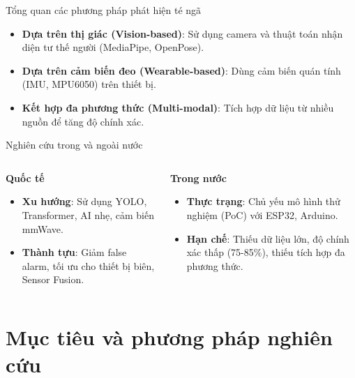 \begin{frame}{Tổng quan các phương pháp phát hiện té ngã}
    \begin{itemize}
        \item \textbf{Dựa trên thị giác (Vision-based)}: Sử dụng camera và thuật toán nhận diện tư thế người (MediaPipe, OpenPose).
        \item \textbf{Dựa trên cảm biến đeo (Wearable-based)}: Dùng cảm biến quán tính (IMU, MPU6050) trên thiết bị.
        \item \textbf{Kết hợp đa phương thức (Multi-modal)}: Tích hợp dữ liệu từ nhiều nguồn để tăng độ chính xác.
    \end{itemize}
\end{frame}

\begin{frame}{Nghiên cứu trong và ngoài nước}
    \begin{columns}[T]
        \begin{column}{0.48\textwidth}
            \textbf{Quốc tế}
            \begin{itemize}
                \item \textbf{Xu hướng}: Sử dụng YOLO, Transformer, AI nhẹ, cảm biến mmWave.
                \item \textbf{Thành tựu}: Giảm false alarm, tối ưu cho thiết bị biên, Sensor Fusion.
            \end{itemize}
        \end{column}
        \begin{column}{0.48\textwidth}
            \textbf{Trong nước}
            \begin{itemize}
                \item \textbf{Thực trạng}: Chủ yếu mô hình thử nghiệm (PoC) với ESP32, Arduino.
                \item \textbf{Hạn chế}: Thiếu dữ liệu lớn, độ chính xác thấp (75-85\%), thiếu tích hợp đa phương thức.
            \end{itemize}
        \end{column}
    \end{columns}
\end{frame}

\section{Mục tiêu và phương pháp nghiên cứu}

